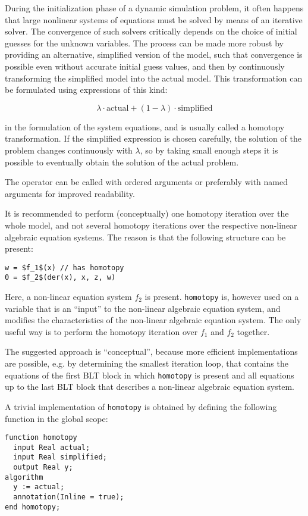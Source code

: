 \begin{nonnormative}
During the initialization phase of a dynamic simulation
problem, it often happens that large nonlinear systems of equations must
be solved by means of an iterative solver. The convergence of such
solvers critically depends on the choice of initial guesses for the
unknown variables. The process can be made more robust by providing an
alternative, simplified version of the model, such that convergence is
possible even without accurate initial guess values, and then by
continuously transforming the simplified model into the actual model.
This transformation can be formulated using expressions of this kind:

$$\lambda\cdot\text{actual} + (1-\lambda)\cdot\text{simplified}$$

in the formulation of the system equations, and is usually called
a homotopy transformation. If the simplified expression is chosen
carefully, the solution of the problem changes continuously with $\lambda$,
so by taking small enough steps it is possible to eventually obtain the
solution of the actual problem.

The operator can be called with ordered arguments or preferably
with named arguments for improved readability.

It is recommended to perform (conceptually) one homotopy iteration
over the whole model, and not several homotopy iterations over the
respective non-linear algebraic equation systems. The reason is that the
following structure can be present:
\begin{lstlisting}[language=modelica, mathescape=true]
w = $f_1$(x) // has homotopy
0 = $f_2$(der(x), x, z, w)
\end{lstlisting}

Here, a non-linear equation system $f_2$
is present. \lstinline!homotopy! is, however used on a variable
that is an ``input'' to the non-linear algebraic equation system, and
modifies the characteristics of the non-linear algebraic equation
system. The only useful way is to perform the homotopy iteration over
$f_1$ and $f_2$ together.

The suggested approach is ``conceptual'', because more efficient
implementations are possible, e.g. by determining the smallest iteration
loop, that contains the equations of the first BLT block in which
\lstinline!homotopy! is present and all equations up to the last BLT block
that describes a non-linear algebraic equation system.

A trivial implementation of \lstinline!homotopy! is obtained by
defining the following function in the global scope:
\begin{lstlisting}[language=modelica]
function homotopy
  input Real actual;
  input Real simplified;
  output Real y;
algorithm
  y := actual;
  annotation(Inline = true);
end homotopy;
\end{lstlisting}


\end{nonnormative}
